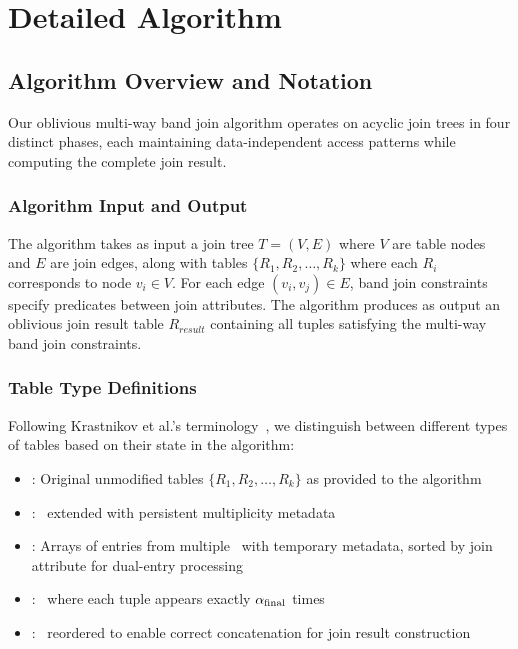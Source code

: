 \chapter{Detailed Algorithm}

\section{Algorithm Overview and Notation}

Our oblivious multi-way band join algorithm operates on acyclic join trees in four distinct phases, each maintaining data-independent access patterns while computing the complete join result.

\subsection{Algorithm Input and Output}

The algorithm takes as input a join tree $T = (V, E)$ where $V$ are table nodes and $E$ are join edges, along with tables $\{R_1, R_2, \ldots, R_k\}$ where each $R_i$ corresponds to node $v_i \in V$. For each edge $(v_i, v_j) \in E$, band join constraints specify predicates between join attributes. The algorithm produces as output an oblivious join result table $R_{result}$ containing all tuples satisfying the multi-way band join constraints.

\subsection{Table Type Definitions}

Following Krastnikov et al.'s terminology~\cite{krastnikov2020}, we distinguish between different types of tables based on their state in the algorithm:

\begin{itemize}
\item \textbf{}: Original unmodified tables $\{R_1, R_2, \ldots, R_k\}$ as provided to the algorithm
\item \textbf{\augmentedtables}: \ extended with persistent multiplicity metadata 
\item \textbf{\combinedtables}: Arrays of entries from multiple \augmentedtables\ with temporary metadata, sorted by join attribute for dual-entry processing
\item \textbf{\expandedtables}: \augmentedtables\ where each tuple appears exactly $\alpha_{\text{final}}$ times
\item \textbf{\alignedtables}: \expandedtables\ reordered to enable correct concatenation for join result construction
\end{itemize}

